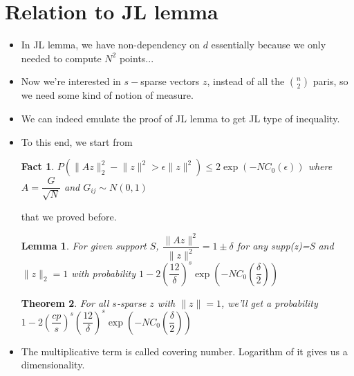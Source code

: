\documentclass[11pt,reqno]{amsart}
\newtheorem{fact}{Fact}
\newtheorem{theorem}{Theorem}
\newtheorem{lemma}[theorem]{Lemma}
\theoremstyle{remark}
\begin{document}
\begin{sloppypar}
\section*{Relation to JL lemma}
\begin{itemize}
\item In JL lemma, we have non-dependency on $d$ essentially 
because we only needed to compute $N^2$ points...
\item Now we're interested in $s-$sparse vectors $z$, instead of 
all the $\binom{n}{2}$ paris, so we need some kind of notion of measure.
\item We can indeed emulate the proof of JL lemma to get JL type of inequality.
\item To this end, we start from
\begin{fact}
$P(\lVert Az\rVert^2_2-\lVert z\rVert^2>\epsilon\lVert z\rVert^2)\leq 2\exp(-N C_0(\epsilon))$
where $A=\dfrac G{\sqrt{N}}$ and $G_{ij}\sim N(0,1)$
\end{fact}
that we proved before.
\begin{lemma}
For given support $S$, $\dfrac{\lVert Az\rVert^2}{\lVert z\rVert^2}=1\pm\delta$ for
any supp(z)=S and $\lVert z\rVert_2=1$ with probability $1-2(\dfrac{12}\delta)^s\exp(-N C_0(\dfrac{\delta}2))$
\end{lemma}
\begin{theorem}
For all $s$-sparse $z$ with $\lVert z\rVert=1$, we'll get a probability $1-2(\dfrac{cp}{s})^s(\dfrac{12}{\delta})^s\exp(-NC_0(\dfrac{\delta}2))$
\end{theorem}
\item The multiplicative term is called covering number. Logarithm of it gives us a dimensionality.
\end{itemize}

\end{sloppypar}
\end{document}
